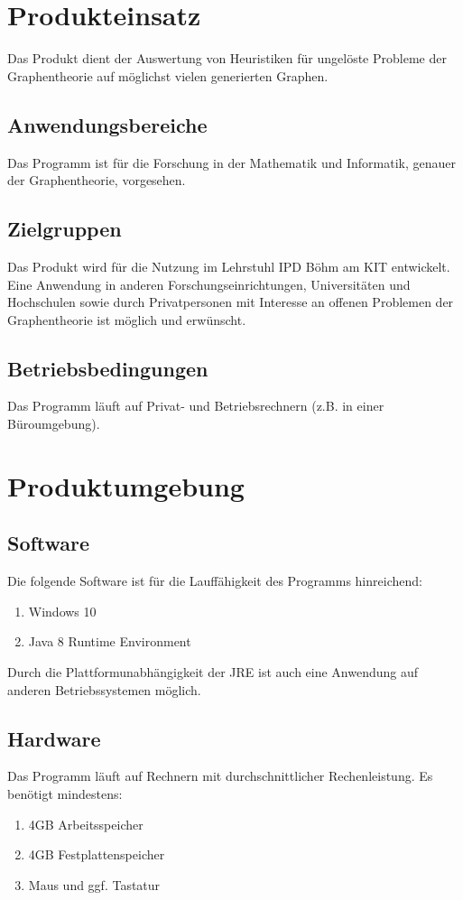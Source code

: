 \documentclass{article}
\begin{document}
	
	
	
	\section{Produkteinsatz}
	Das Produkt dient der Auswertung von Heuristiken für ungelöste Probleme der Graphentheorie auf möglichst vielen generierten Graphen.
	
	\subsection{Anwendungsbereiche}
	Das Programm ist für die Forschung in der Mathematik und Informatik, genauer der Graphentheorie, vorgesehen.
	
	\subsection{Zielgruppen}
	Das Produkt wird für die Nutzung im Lehrstuhl IPD Böhm am KIT entwickelt. Eine Anwendung in anderen Forschungseinrichtungen, Universitäten und Hochschulen sowie durch Privatpersonen mit Interesse an offenen Problemen der Graphentheorie ist möglich und erwünscht.
	
	\subsection{Betriebsbedingungen}
	Das Programm läuft auf Privat- und Betriebsrechnern (z.B. in einer Büroumgebung).
	
	
	
	\section{Produktumgebung}
	
	\subsection{Software}
	Die folgende Software ist für die Lauffähigkeit des Programms hinreichend:
	\begin{enumerate}[--]
		\item{Windows 10}
		\item{Java 8 Runtime Environment}
	\end{enumerate}
	Durch die Plattformunabhängigkeit der JRE ist auch eine Anwendung auf anderen Betriebssystemen möglich.
	
	\subsection{Hardware}
	Das Programm läuft auf Rechnern mit durchschnittlicher Rechenleistung. Es benötigt mindestens:
	\begin{enumerate}[--]
		\item{4GB Arbeitsspeicher}
		\item{4GB Festplattenspeicher}
		\item{Maus und ggf. Tastatur}
	\end{enumerate}
	
\end{document}

